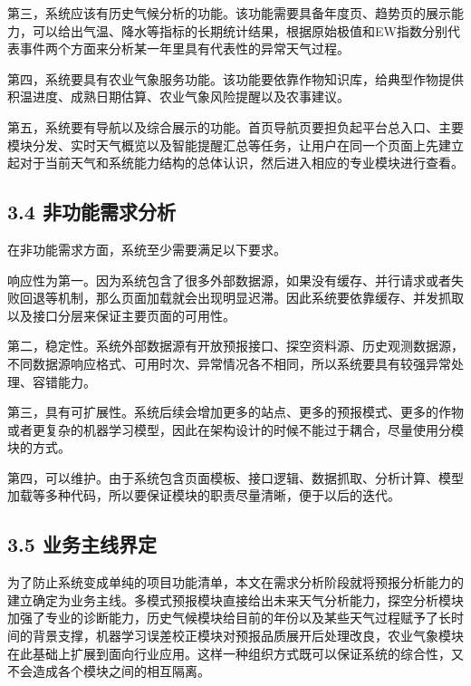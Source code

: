 第三，系统应该有历史气候分析的功能。该功能需要具备年度页、趋势页的展示能力，可以给出气温、降水等指标的长期统计结果，根据原始极值和EW指数分别代表事件两个方面来分析某一年里具有代表性的异常天气过程。

第四，系统要具有农业气象服务功能。该功能要依靠作物知识库，给典型作物提供积温进度、成熟日期估算、农业气象风险提醒以及农事建议。

第五，系统要有导航以及综合展示的功能。首页导航页要担负起平台总入口、主要模块分发、实时天气概览以及智能提醒汇总等任务，让用户在同一个页面上先建立起对于当前天气和系统能力结构的总体认识，然后进入相应的专业模块进行查看。

\subsection{3.4 非功能需求分析}

在非功能需求方面，系统至少需要满足以下要求。

响应性为第一。因为系统包含了很多外部数据源，如果没有缓存、并行请求或者失败回退等机制，那么页面加载就会出现明显迟滞。因此系统要依靠缓存、并发抓取以及接口分层来保证主要页面的可用性。

第二，稳定性。系统外部数据源有开放预报接口、探空资料源、历史观测数据源，不同数据源响应格式、可用时次、异常情况各不相同，所以系统要具有较强异常处理、容错能力。

第三，具有可扩展性。系统后续会增加更多的站点、更多的预报模式、更多的作物或者更复杂的机器学习模型，因此在架构设计的时候不能过于耦合，尽量使用分模块的方式。

第四，可以维护。由于系统包含页面模板、接口逻辑、数据抓取、分析计算、模型加载等多种代码，所以要保证模块的职责尽量清晰，便于以后的迭代。

\subsection{3.5 业务主线界定}

为了防止系统变成单纯的项目功能清单，本文在需求分析阶段就将预报分析能力的建立确定为业务主线。多模式预报模块直接给出未来天气分析能力，探空分析模块加强了专业的诊断能力，历史气候模块给目前的年份以及某些天气过程赋予了长时间的背景支撑，机器学习误差校正模块对预报品质展开后处理改良，农业气象模块在此基础上扩展到面向行业应用。这样一种组织方式既可以保证系统的综合性，又不会造成各个模块之间的相互隔离。

